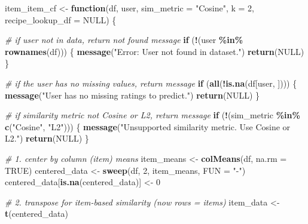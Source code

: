 \documentclass[
]{article}
\newenvironment{Shaded}{\begin{snugshade}}{\end{snugshade}}
\newcommand{\AttributeTok}[1]{\textcolor[rgb]{0.13,0.29,0.53}{#1}}
\newcommand{\CommentTok}[1]{\textcolor[rgb]{0.56,0.35,0.01}{\textit{#1}}}
\newcommand{\ConstantTok}[1]{\textcolor[rgb]{0.56,0.35,0.01}{#1}}
\newcommand{\ControlFlowTok}[1]{\textcolor[rgb]{0.13,0.29,0.53}{\textbf{#1}}}
\newcommand{\DecValTok}[1]{\textcolor[rgb]{0.00,0.00,0.81}{#1}}
\newcommand{\FunctionTok}[1]{\textcolor[rgb]{0.13,0.29,0.53}{\textbf{#1}}}
\newcommand{\NormalTok}[1]{#1}
\newcommand{\OtherTok}[1]{\textcolor[rgb]{0.56,0.35,0.01}{#1}}
\newcommand{\SpecialCharTok}[1]{\textcolor[rgb]{0.81,0.36,0.00}{\textbf{#1}}}
\newcommand{\StringTok}[1]{\textcolor[rgb]{0.31,0.60,0.02}{#1}}
\begin{document}
\begin{Shaded}
\begin{Highlighting}[]
\NormalTok{item\_item\_cf }\OtherTok{\textless{}{-}} \ControlFlowTok{function}\NormalTok{(df, user, }\AttributeTok{sim\_metric =} \StringTok{"Cosine"}\NormalTok{, }\AttributeTok{k =} \DecValTok{2}\NormalTok{, }
                         \AttributeTok{recipe\_lookup\_df =} \ConstantTok{NULL}\NormalTok{) \{}
  
  \CommentTok{\# if user not in data, return not found message}
  \ControlFlowTok{if}\NormalTok{ (}\SpecialCharTok{!}\NormalTok{(user }\SpecialCharTok{\%in\%} \FunctionTok{rownames}\NormalTok{(df))) \{}
    \FunctionTok{message}\NormalTok{(}\StringTok{"Error: User not found in dataset."}\NormalTok{)}
    \FunctionTok{return}\NormalTok{(}\ConstantTok{NULL}\NormalTok{)}
\NormalTok{  \}}

  \CommentTok{\# if the user has no missing values, return message}
  \ControlFlowTok{if}\NormalTok{ (}\FunctionTok{all}\NormalTok{(}\SpecialCharTok{!}\FunctionTok{is.na}\NormalTok{(df[user, ]))) \{}
    \FunctionTok{message}\NormalTok{(}\StringTok{"User has no missing ratings to predict."}\NormalTok{)}
    \FunctionTok{return}\NormalTok{(}\ConstantTok{NULL}\NormalTok{)}
\NormalTok{  \}}

  \CommentTok{\# if similarity metric not Cosine or L2, return message}
  \ControlFlowTok{if}\NormalTok{ (}\SpecialCharTok{!}\NormalTok{(sim\_metric }\SpecialCharTok{\%in\%} \FunctionTok{c}\NormalTok{(}\StringTok{"Cosine"}\NormalTok{, }\StringTok{"L2"}\NormalTok{))) \{}
    \FunctionTok{message}\NormalTok{(}\StringTok{"Unsupported similarity metric. Use \textquotesingle{}Cosine\textquotesingle{} or \textquotesingle{}L2\textquotesingle{}."}\NormalTok{)}
    \FunctionTok{return}\NormalTok{(}\ConstantTok{NULL}\NormalTok{)}
\NormalTok{  \}}
  
  \CommentTok{\# 1. center by column (item) means}
\NormalTok{  item\_means }\OtherTok{\textless{}{-}} \FunctionTok{colMeans}\NormalTok{(df, }\AttributeTok{na.rm =} \ConstantTok{TRUE}\NormalTok{)}
\NormalTok{  centered\_data }\OtherTok{\textless{}{-}} \FunctionTok{sweep}\NormalTok{(df, }\DecValTok{2}\NormalTok{, item\_means, }\AttributeTok{FUN =} \StringTok{"{-}"}\NormalTok{)}
\NormalTok{  centered\_data[}\FunctionTok{is.na}\NormalTok{(centered\_data)] }\OtherTok{\textless{}{-}} \DecValTok{0}

  \CommentTok{\# 2. transpose for item{-}based similarity (now rows = items)}
\NormalTok{  item\_data }\OtherTok{\textless{}{-}} \FunctionTok{t}\NormalTok{(centered\_data)}


\end{Highlighting}
\end{Shaded}
\end{document}
